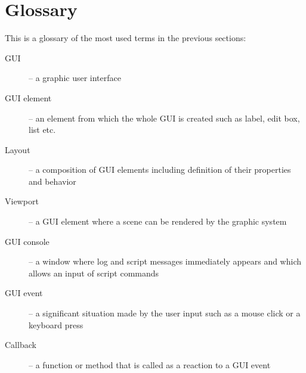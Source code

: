 \section{Glossary}
This is a glossary of the most used terms in the previous sections:

\begin{description}
  \item[GUI] -- a graphic user interface
  \item[GUI element] -- an element from which the whole GUI is created such as label, edit box, list etc.
  \item[Layout] -- a composition of GUI elements including definition of their properties and behavior
  \item[Viewport] -- a GUI element where a scene can be rendered by the graphic system
  \item[GUI console] -- a window where log and script messages immediately appears and which allows an input of script commands
  \item[GUI event] -- a significant situation made by the user input such as a mouse click or a keyboard press
  \item[Callback] -- a function or method that is called as a reaction to a GUI event
\end{description}